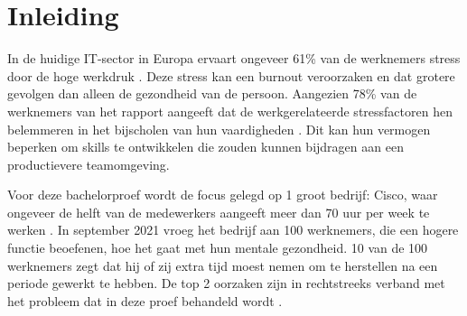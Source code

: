 


% 

\section{Inleiding}%
\label{sec:inleiding}




In de huidige IT-sector in Europa ervaart ongeveer 61\% van de werknemers stress door de hoge werkdruk \autocite{ISACA2025}. Deze stress kan een burnout veroorzaken en dat grotere gevolgen dan alleen de gezondheid van de persoon. Aangezien 78\% van de werknemers van het rapport aangeeft dat de werkgerelateerde stressfactoren hen belemmeren in het bijscholen van hun vaardigheden \autocite{Staff2025} . Dit kan hun vermogen beperken om skills te ontwikkelen die zouden kunnen bijdragen aan een productievere teamomgeving.

\vspace{1em}Voor deze bachelorproef wordt de focus gelegd op 1 groot bedrijf: Cisco, waar ongeveer de helft van de medewerkers aangeeft meer dan 70 uur per week te werken \autocite{Xavier2025}. In september 2021 vroeg het bedrijf aan 100 werknemers, die een hogere functie beoefenen, hoe het gaat met hun mentale gezondheid. 10 van de 100 werknemers zegt dat hij of zij extra tijd moest nemen om te herstellen na een periode gewerkt te hebben. De top 2 oorzaken zijn in rechtstreeks verband met het probleem dat in deze proef behandeld wordt \autocite{Burton2021}. 

